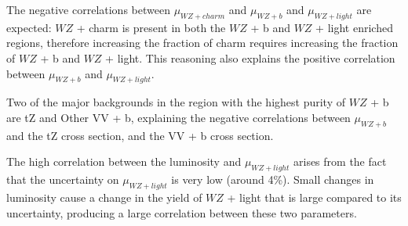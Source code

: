 \documentclass[NOTE, atlasdraft=true, texlive=2016, UKenglish]{\ATLASLATEXPATH atlasdoc}
\begin{document}
The negative correlations between $\mu_{WZ+charm}$ and $\mu_{WZ+b}$ and $\mu_{WZ+light}$ are expected: $WZ$ + charm is present in both the $WZ$ + b and $WZ$ + light enriched regions, therefore increasing the fraction of charm requires increasing the fraction of $WZ$ + b and $WZ$ + light. This reasoning also explains the positive correlation between $\mu_{WZ+b}$ and $\mu_{WZ+light}$. 

Two of the major backgrounds in the region with the highest purity of $WZ$ + b are tZ and Other VV + b, explaining the negative correlations between $\mu_{WZ+b}$ and the tZ cross section, and the VV + b cross section.

The high correlation between the luminosity and $\mu_{WZ+light}$ arises from the fact that the uncertainty on $\mu_{WZ+light}$ is very low (around 4\%). Small changes in luminosity cause a change in the yield of $WZ$ + light that is large compared to its uncertainty, producing a large correlation between these two parameters.



%        

\end{document}
